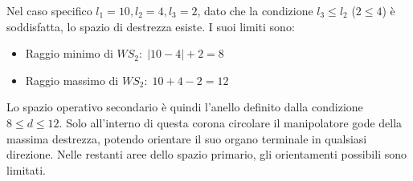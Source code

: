 \documentclass[11pt, a4paper]{article}
\begin{document}
\begin{par}
\begin{flushleft}
Nel caso specifico $l_1 =10,l_2 =4,l_3 =2$, dato che la condizione $l_3 \le l_2$ ($2\le 4$) è soddisfatta, lo spazio di destrezza esiste. I suoi limiti sono:
\end{flushleft}
\end{par}

\begin{itemize}
\setlength{\itemsep}{-1ex}
   \item{\begin{flushleft} Raggio minimo di $WS_2 :\;|10-4|+2=8$ \end{flushleft}}
   \item{\begin{flushleft} Raggio massimo di $WS_2 :\;10+4-2=12$ \end{flushleft}}
\end{itemize}

\begin{par}
\begin{flushleft}
Lo spazio operativo secondario è quindi l'anello definito dalla condizione $8\le d\le 12$. Solo all'interno di questa corona circolare il manipolatore gode della massima destrezza, potendo orientare il suo organo terminale in qualsiasi direzione. Nelle restanti aree dello spazio primario, gli orientamenti possibili sono limitati.
\end{flushleft}
\end{par}
\end{document}

